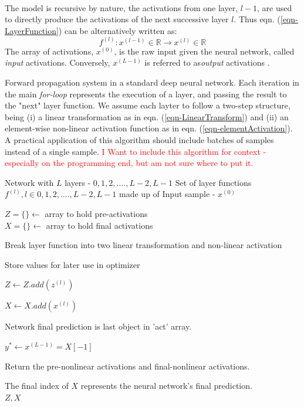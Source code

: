 \documentclass[12pt,letterpaper]{article}
\begin{document}
\paragraph*{}The model is recursive by nature, the activations from one layer, $l-1$, are used to directly produce the activations of the next successive layer $l$. Thus eqn. (\ref{eqn-LayerFunction}) can be alternatively written as:
\begin{equation}
\label{eqn-altLayerFunction}
f^{(l)} : x^{(l-1)} \in \mathbb{R} \rightarrow x^{(l)} \in \mathbb{R}
\end{equation}
The array of activations, $x^{(0)}$, is the raw input given the neural network, called \textit{input} activations. Conversely, $x^{(L-1)}$ is referred to as\textit{output} activations \cite{Geron,James,Loy}.

\begin{algorithm}[H]
\caption{Forward propagation system in a standard deep neural network. Each iteration in the main \textit{for-loop} represents the execution of a layer, and passing the result to the "next" layer function. We assume each layter to follow a two-step structure, being (i) a linear transformation as in eqn. (\ref{eqn-LinearTransform}) and (ii) an element-wise non-linear activation function as in eqn. (\ref{eqn-elementActivation}).  A practical application of this algorithm should include batches of samples instead of a single sample.
\textcolor{red}{I Want to include this algorithm for context - especially on the programming end, but am not sure where to put it. }}
\label{algFeedForward}

\begin{algorithmic}
\REQUIRE Network with $L$ layers - $0,1,2,....,L-2,L-1$
\REQUIRE Set of layer functions $f^{(l)}, l \in 0,1,2,....,L-2,L-1$ made up of 
\REQUIRE Input sample - $x^{(0)}$

$Z = \{\} \leftarrow$ array to hold pre-activations \\
$X = \{\} \leftarrow$ array to hold final activations \\

	
	\item Break layer function into two linear transformation and non-linear activation
	
	\item Store values for later use in optimizer
	\item $Z \leftarrow Z.add(z^{(l)})$
	\item $X \leftarrow X.add(x^{(l)})$
\ENDFOR

\item Network final prediction is last object in 'act' array.
\item $y^* \leftarrow x^{(L-1)} = X[-1]$
\item Return the pre-nonlinear activations and final-nonlinear activations.\\
\item The final index of $X$ represents the neural network's final prediction. \\
\RETURN $Z , X$


\end{algorithmic}
\end{algorithm}
\end{document}
